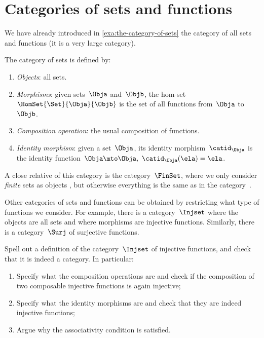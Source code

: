 
\section{Categories of sets and functions}

We have already introduced in \cref{exa:the-category-of-sets} the category of all sets and functions (it is a very large category).

\begin{ctdefinition} \index{\Set}
    \label{def:Set}
    The category of sets \Set is defined by:
    \begin{enumerate}
        \item \emph{Objects}: all sets.
        \item \emph{Morphisms}: given sets~$\Obja$ and~$\Objb$, the hom-set~$\HomSet{\Set}{\Obja}{\Objb}$ is the set of all functions from~$\Obja$ to~$\Objb$.
        \item \emph{Composition operation}: the usual composition of functions.
        \item \emph{Identity morphism}: given a set~$\Obja$, its identity morphism~$\catid_\Obja$ is the identity function~$\Obja \mto \Obja, \ \catid_\Obja(\ela) = \ela$.
    \end{enumerate}
\end{ctdefinition}

A close relative of this category is the category~$\FinSet$, where we only consider \emph{finite} sets as objects , but otherwise everything is the same as in the category~\Set.

Other categories of sets and functions can be obtained by restricting what type of functions we consider.
For example, there is a category~$\Injset$ where the objects are all sets and where morphisms are injective functions.
Similarly, there is a category~$\Surj$ of surjective functions.

\begin{exercise}
    Spell out a definition of the category~$\Injset$ of injective functions, and check that it is indeed a category.
    In particular:
    \begin{enumerate}
        \item Specify what the composition operations are and check if the composition of two composable injective functions is again injective;
        \item Specify what the identity morphisms are and check that they are indeed injective functions;
        \item Argue why the associativity condition is satisfied.
    \end{enumerate}
\end{exercise}

